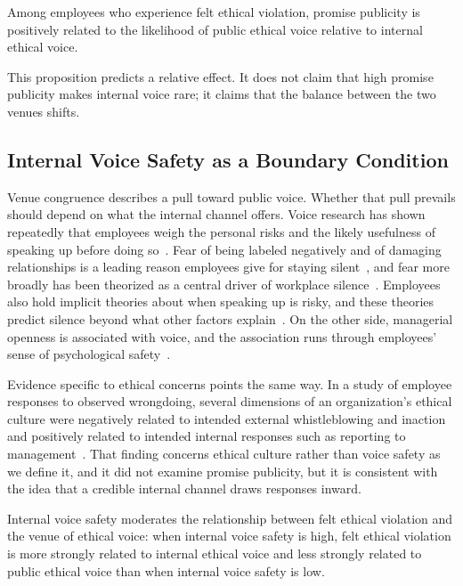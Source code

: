 \begin{proposition}
Among employees who experience felt ethical violation, promise publicity is positively related to the likelihood of public ethical voice relative to internal ethical voice.
\end{proposition}

This proposition predicts a relative effect. It does not claim that high promise publicity makes internal voice rare; it claims that the balance between the two venues shifts.

\subsection{Internal Voice Safety as a Boundary Condition}

Venue congruence describes a pull toward public voice. Whether that pull prevails should depend on what the internal channel offers. Voice research has shown repeatedly that employees weigh the personal risks and the likely usefulness of speaking up before doing so~\citep{morrison2014employee,morrison2023employee}. Fear of being labeled negatively and of damaging relationships is a leading reason employees give for staying silent~\citep{milliken2003exploratory}, and fear more broadly has been theorized as a central driver of workplace silence~\citep{kishgephart2009silenced}. Employees also hold implicit theories about when speaking up is risky, and these theories predict silence beyond what other factors explain~\citep{detert2011implicit}. On the other side, managerial openness is associated with voice, and the association runs through employees' sense of psychological safety~\citep{detert2007leadership}.

Evidence specific to ethical concerns points the same way. In a study of employee responses to observed wrongdoing, several dimensions of an organization's ethical culture were negatively related to intended external whistleblowing and inaction and positively related to intended internal responses such as reporting to management~\citep{kaptein2011inaction}. That finding concerns ethical culture rather than voice safety as we define it, and it did not examine promise publicity, but it is consistent with the idea that a credible internal channel draws responses inward.

\begin{proposition}
Internal voice safety moderates the relationship between felt ethical violation and the venue of ethical voice: when internal voice safety is high, felt ethical violation is more strongly related to internal ethical voice and less strongly related to public ethical voice than when internal voice safety is low.
\end{proposition}

